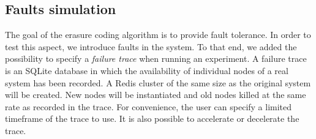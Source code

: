 \subsection{Faults simulation}

The goal of the erasure coding algorithm is to provide fault tolerance.
In order to test this aspect, we introduce faults in the system. To that end, we added the possibility to specify a \textit{failure trace} when running an experiment.
A failure trace is an SQLite database in which the availability of individual nodes of a real system has been recorded.
A Redis cluster of the same size as the original system will be created.
New nodes will be instantiated and old nodes killed at the same rate as recorded in the trace.
For convenience, the user can specify a limited timeframe of the trace to use.
It is also possible to accelerate or decelerate the trace.
